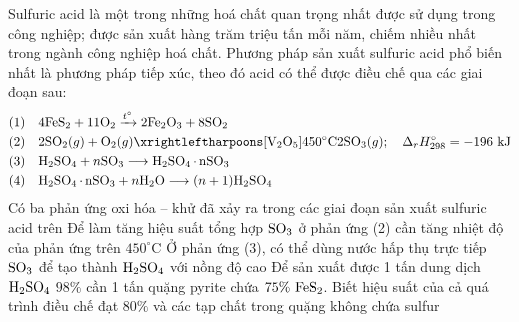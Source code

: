 \documentclass[11pt,a4paper]{article}
\begin{document}
\begin{ex}
Sulfuric acid là một trong những hoá chất quan trọng nhất được sử dụng trong công nghiệp; được sản xuất hàng trăm triệu tấn mỗi năm, chiếm nhiều nhất trong ngành công nghiệp hoá chất. Phương pháp sản xuất sulfuric acid phổ biến nhất là phương pháp tiếp xúc, theo đó acid có thể được điều chế qua các giai đoạn sau:
\begin{align*}
(1) &\quad 4\ce{FeS2} + 11\ce{O2} \xrightarrow{t^\circ} 2\ce{Fe2O3} + 8\ce{SO2} \\
(2) &\quad 2\ce{SO2}(g) + \ce{O2}(g) \xrightleftharpoons[\text{V}_2\text{O}_5]{450^\circ\text{C}} 2\ce{SO3}(g);\quad \Delta_r H^\circ_{298} = -196\text{ kJ} \\
(3) &\quad \ce{H2SO4} + n\ce{SO3} \longrightarrow \ce{H2SO4.nSO3} \\
(4) &\quad \ce{H2SO4.nSO3} + n\ce{H2O} \longrightarrow (n+1)\ce{H2SO4}
\end{align*}
\choiceTF
{Có ba phản ứng oxi hóa – khử đã xảy ra trong các giai đoạn sản xuất sulfuric acid trên}
{Để làm tăng hiệu suất tổng hợp $\ce{SO3}$ ở phản ứng (2) cần tăng nhiệt độ của phản ứng trên $450^\circ\text{C}$}
{Ở phản ứng (3), có thể dùng nước hấp thụ trực tiếp $\ce{SO3}$ để tạo thành $\ce{H2SO4}$ với nồng độ cao}
{\True Để sản xuất được 1 tấn dung dịch $\ce{H2SO4}$ $98\%$ cần 1 tấn quặng pyrite chứa $75\%\ \ce{FeS2}$. Biết hiệu suất của cả quá trình điều chế đạt $80\%$ và các tạp chất trong quặng không chứa sulfur}

\end{ex}
\end{document}
